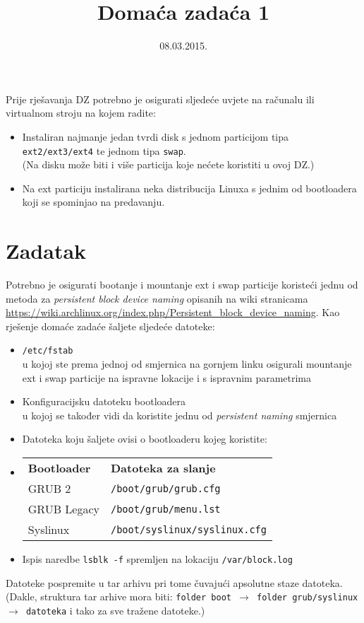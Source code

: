 \documentclass[12pt,a4paper]{article}
\begin{document}
	\title{Domaća zadaća 1}
	\date{\vspace{-5ex} 08.03.2015.}
	\maketitle
	Prije rješavanja DZ potrebno je osigurati sljedeće uvjete na računalu ili virtualnom stroju na kojem radite:
	\begin{itemize}
		\item Instaliran najmanje jedan tvrdi disk s jednom particijom tipa \texttt{ext2/ext3/ext4} te jednom tipa \texttt{swap}.\\ {\small (Na disku može biti i više particija koje nećete koristiti u ovoj DZ.)}
		\item Na ext particiju instalirana neka distribucija Linuxa s jednim od bootloadera koji se spominjao na predavanju.
	\end{itemize}
	\section*{Zadatak}
	Potrebno je osigurati bootanje i mountanje ext i swap particije koristeći jednu od metoda za \emph{persistent block device naming} opisanih na wiki stranicama \url{https://wiki.archlinux.org/index.php/Persistent_block_device_naming}. Kao rješenje domaće zadaće šaljete sljedeće datoteke:
	\begin{itemize}
		\item \texttt{/etc/fstab}\\
			u kojoj ste prema jednoj od smjernica na gornjem linku osigurali mountanje ext i swap particije na ispravne lokacije i s ispravnim parametrima
		\item Konfiguracijsku datoteku bootloadera\\
			u kojoj se također vidi da koristite jednu od \emph{persistent naming} smjernica
		\item[] Datoteka koju šaljete ovisi o bootloaderu kojeg koristite:
		\item[] \begin{tabular}{p{4cm} p{5cm}}
					\textbf{Bootloader} & \textbf{Datoteka za slanje} \\
					GRUB 2 & \texttt{/boot/grub/grub.cfg}\\
					GRUB Legacy & \texttt{/boot/grub/menu.lst}\\
					Syslinux & \texttt{/boot/syslinux/syslinux.cfg}
				\end{tabular}
		\item Ispis naredbe \texttt{lsblk -f} spremljen na lokaciju \texttt{/var/block.log}
	\end{itemize}
	
	Datoteke pospremite u tar arhivu pri tome čuvajući apsolutne staze datoteka. (Dakle, struktura tar arhive mora biti: \texttt{folder boot $\rightarrow$ folder grub/syslinux $\rightarrow$ datoteka} i tako za sve tražene datoteke.)\\
	
\end{document}
